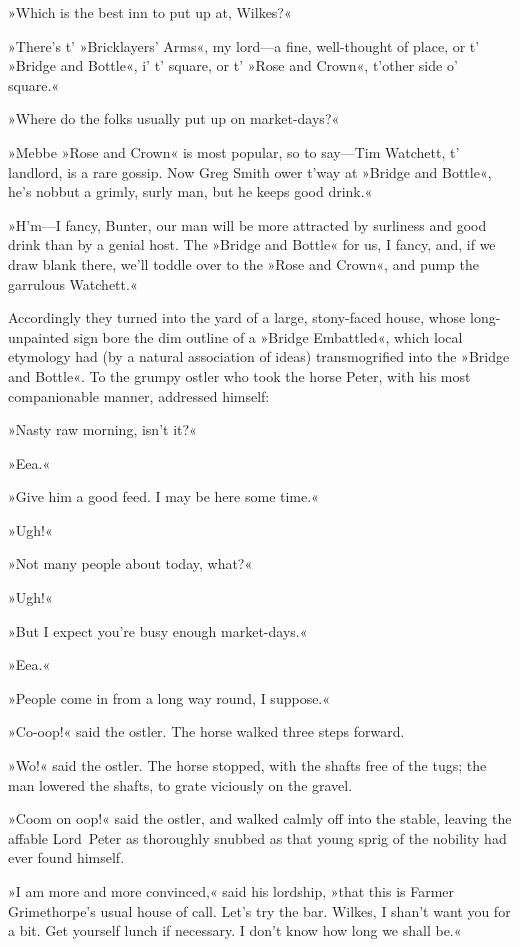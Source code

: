 »Which is the best inn to put up at, Wilkes?«

»There's t' »Bricklayers' Arms«, my lord—a fine, well-thought of place, or t' »Bridge and Bottle«, i' t' square, or t' »Rose and Crown«, t'other side o' square.«

»Where do the folks usually put up on market-days?«

»Mebbe »Rose and Crown« is most popular, so to say—Tim Watchett, t' landlord, is a rare gossip. Now Greg Smith ower t'way at »Bridge and Bottle«, he's nobbut a grimly, surly man, but he keeps good drink.«

»H'm—I fancy, Bunter, our man will be more attracted by surliness and good drink than by a genial host. The »Bridge and Bottle« for us, I fancy, and, if we draw blank there, we'll toddle over to the »Rose and Crown«, and pump the garrulous Watchett.«

Accordingly they turned into the yard of a large, stony-faced house, whose long-unpainted sign bore the dim outline of a »Bridge Embattled«, which local etymology had (by a natural association of ideas) transmogrified into the »Bridge and Bottle«. To the grumpy ostler who took the horse Peter, with his most companionable manner, addressed himself:

»Nasty raw morning, isn't it?«

»Eea.«

»Give him a good feed. I may be here some time.«

»Ugh!«

»Not many people about today, what?«

»Ugh!«

»But I expect you're busy enough market-days.«

»Eea.«

»People come in from a long way round, I suppose.«

»Co-oop!« said the ostler. The horse walked three steps forward.

»Wo!« said the ostler. The horse stopped, with the shafts free of the tugs; the man lowered the shafts, to grate viciously on the gravel.

»Coom on oop!« said the ostler, and walked calmly off into the stable, leaving the affable Lord~Peter as thoroughly snubbed as that young sprig of the nobility had ever found himself.

»I am more and more convinced,« said his lordship, »that this is Farmer Grimethorpe's usual house of call. Let's try the bar. Wilkes, I shan't want you for a bit. Get yourself lunch if necessary. I don't know how long we shall be.«

